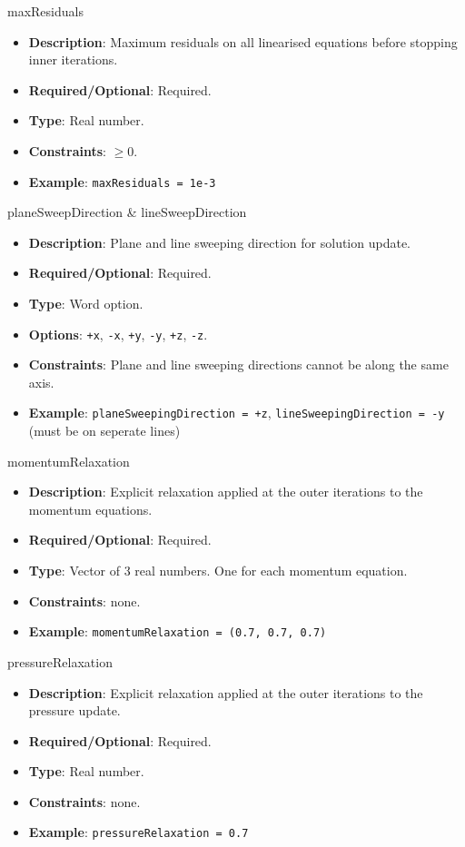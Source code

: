 maxResiduals
\vspace{\the\parameterListSpacing}
\begin{itemize}
    \item {\bf Description}: Maximum residuals on all linearised equations before stopping inner iterations.
    \item {\bf Required/Optional}: Required.
    \item {\bf Type}: Real number.
    \item {\bf Constraints}: $ \geq 0$.
    \item {\bf Example}: \lstinline!maxResiduals = 1e-3!
\end{itemize}


planeSweepDirection \& lineSweepDirection
\vspace{\the\parameterListSpacing}
\begin{itemize}
    \item {\bf Description}: Plane and line sweeping direction for solution update.
    \item {\bf Required/Optional}: Required.
    \item {\bf Type}: Word option.
    \item {\bf Options}: \lstinline!+x!, \lstinline!-x!, \lstinline!+y!, \lstinline!-y!, \lstinline!+z!, \lstinline!-z!.
    \item {\bf Constraints}: Plane and line sweeping directions cannot be along the same axis.
    \item {\bf Example}: \lstinline!planeSweepingDirection = +z!,  \lstinline!lineSweepingDirection = -y! (must be on seperate lines)
\end{itemize}

momentumRelaxation
\vspace{\the\parameterListSpacing}
\begin{itemize}
    \item {\bf Description}: Explicit relaxation applied at the outer iterations to the momentum equations.
    \item {\bf Required/Optional}: Required.
    \item {\bf Type}: Vector of 3 real numbers. One for each momentum equation.
    \item {\bf Constraints}: none.
    \item {\bf Example}: \lstinline!momentumRelaxation = (0.7, 0.7, 0.7)!
\end{itemize}

pressureRelaxation
\vspace{\the\parameterListSpacing}
\begin{itemize}
    \item {\bf Description}: Explicit relaxation applied at the outer iterations to the pressure update.
    \item {\bf Required/Optional}: Required.
    \item {\bf Type}: Real number.
    \item {\bf Constraints}: none.
    \item {\bf Example}: \lstinline!pressureRelaxation = 0.7!
\end{itemize}

